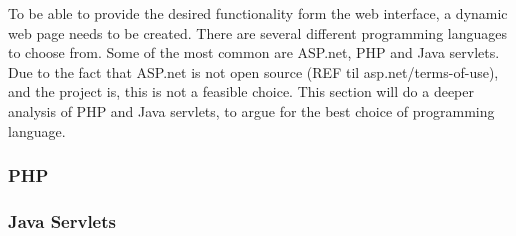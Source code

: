 To be able to provide the desired functionality form the web interface, a dynamic web page needs to be created. There are several different programming languages to choose from. Some of the most common are ASP.net, PHP and Java servlets. Due to the fact that ASP.net is not open source (REF til asp.net/terms-of-use), and the project is, this is not a feasible choice. This section will do a deeper analysis of PHP and Java servlets, to argue for the best choice of programming language.

\subsubsection{PHP}

\subsubsection{Java Servlets}